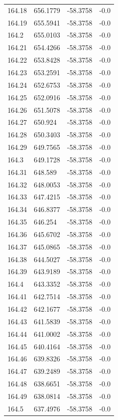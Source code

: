 \begin{table}[H]
\begin{tabular}{llll}
164.18 & 656.1779 & -58.3758 & -0.0 \\
164.19 & 655.5941 & -58.3758 & -0.0 \\
164.2 & 655.0103 & -58.3758 & -0.0 \\
164.21 & 654.4266 & -58.3758 & -0.0 \\
164.22 & 653.8428 & -58.3758 & -0.0 \\
164.23 & 653.2591 & -58.3758 & -0.0 \\
164.24 & 652.6753 & -58.3758 & -0.0 \\
164.25 & 652.0916 & -58.3758 & -0.0 \\
164.26 & 651.5078 & -58.3758 & -0.0 \\
164.27 & 650.924 & -58.3758 & -0.0 \\
164.28 & 650.3403 & -58.3758 & -0.0 \\
164.29 & 649.7565 & -58.3758 & -0.0 \\
164.3 & 649.1728 & -58.3758 & -0.0 \\
164.31 & 648.589 & -58.3758 & -0.0 \\
164.32 & 648.0053 & -58.3758 & -0.0 \\
164.33 & 647.4215 & -58.3758 & -0.0 \\
164.34 & 646.8377 & -58.3758 & -0.0 \\
164.35 & 646.254 & -58.3758 & -0.0 \\
164.36 & 645.6702 & -58.3758 & -0.0 \\
164.37 & 645.0865 & -58.3758 & -0.0 \\
164.38 & 644.5027 & -58.3758 & -0.0 \\
164.39 & 643.9189 & -58.3758 & -0.0 \\
164.4 & 643.3352 & -58.3758 & -0.0 \\
164.41 & 642.7514 & -58.3758 & -0.0 \\
164.42 & 642.1677 & -58.3758 & -0.0 \\
164.43 & 641.5839 & -58.3758 & -0.0 \\
164.44 & 641.0002 & -58.3758 & -0.0 \\
164.45 & 640.4164 & -58.3758 & -0.0 \\
164.46 & 639.8326 & -58.3758 & -0.0 \\
164.47 & 639.2489 & -58.3758 & -0.0 \\
164.48 & 638.6651 & -58.3758 & -0.0 \\
164.49 & 638.0814 & -58.3758 & -0.0 \\
164.5 & 637.4976 & -58.3758 & -0.0 \\

\end{tabular}
\end{table}
